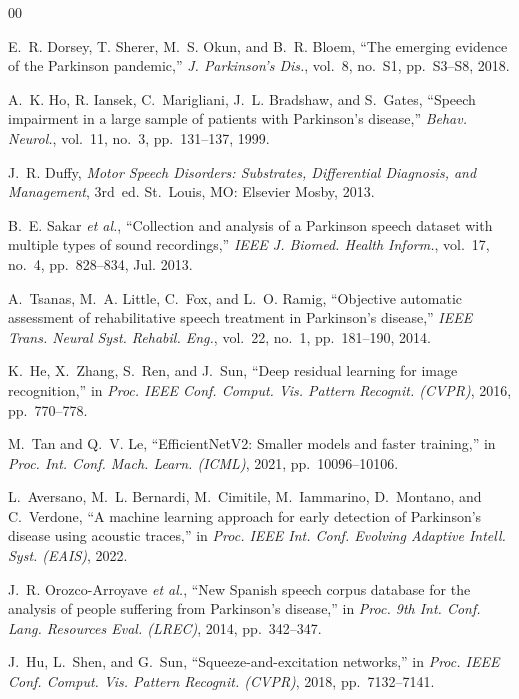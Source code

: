 \documentclass[conference]{IEEEtran}
\begin{document}
\begin{thebibliography}{00}

E.~R. Dorsey, T. Sherer, M.~S. Okun, and B.~R. Bloem, ``The emerging evidence of the Parkinson pandemic,'' \textit{J. Parkinson's Dis.}, vol.~8, no.~S1, pp.~S3--S8, 2018.

A.~K. Ho, R. Iansek, C.~Marigliani, J.~L. Bradshaw, and S.~Gates, ``Speech impairment in a large sample of patients with Parkinson's disease,'' \textit{Behav. Neurol.}, vol.~11, no.~3, pp.~131--137, 1999.

J.~R. Duffy, \textit{Motor Speech Disorders: Substrates, Differential Diagnosis, and Management}, 3rd~ed. St.~Louis, MO: Elsevier Mosby, 2013.

B.~E. Sakar \textit{et al.}, ``Collection and analysis of a Parkinson speech dataset with multiple types of sound recordings,'' \textit{IEEE J. Biomed. Health Inform.}, vol.~17, no.~4, pp.~828--834, Jul. 2013.

A.~Tsanas, M.~A. Little, C.~Fox, and L.~O. Ramig, ``Objective automatic assessment of rehabilitative speech treatment in Parkinson's disease,'' \textit{IEEE Trans. Neural Syst. Rehabil. Eng.}, vol.~22, no.~1, pp.~181--190, 2014.

K.~He, X.~Zhang, S.~Ren, and J.~Sun, ``Deep residual learning for image recognition,'' in \textit{Proc. IEEE Conf. Comput. Vis. Pattern Recognit. (CVPR)}, 2016, pp.~770--778.

M.~Tan and Q.~V. Le, ``EfficientNetV2: Smaller models and faster training,'' in \textit{Proc. Int. Conf. Mach. Learn. (ICML)}, 2021, pp.~10096--10106.

L.~Aversano, M.~L. Bernardi, M.~Cimitile, M.~Iammarino, D.~Montano, and C.~Verdone, ``A machine learning approach for early detection of Parkinson's disease using acoustic traces,'' in \textit{Proc. IEEE Int. Conf. Evolving Adaptive Intell. Syst. (EAIS)}, 2022.

J.~R. Orozco-Arroyave \textit{et al.}, ``New Spanish speech corpus database for the analysis of people suffering from Parkinson's disease,'' in \textit{Proc. 9th Int. Conf. Lang. Resources Eval. (LREC)}, 2014, pp.~342--347.

J.~Hu, L.~Shen, and G.~Sun, ``Squeeze-and-excitation networks,'' in \textit{Proc. IEEE Conf. Comput. Vis. Pattern Recognit. (CVPR)}, 2018, pp.~7132--7141.


\end{thebibliography}
\end{document}
